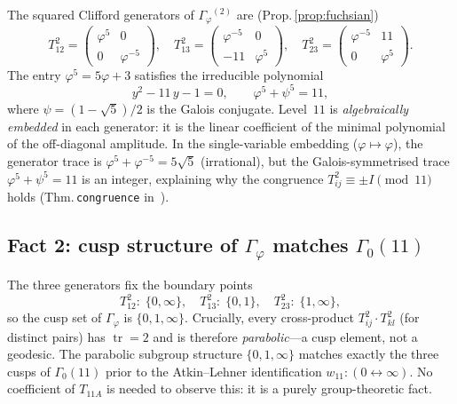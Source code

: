 \documentclass[11pt,a4paper]{article}
\theoremstyle{plain}
\theoremstyle{definition}
\theoremstyle{remark}
\numberwithin{equation}{section}
\providecommand{\Gphi}{\ensuremath{\Gamma_{\varphi}}}
\begin{document}
The squared Clifford generators of $\Gphi^{(2)}$ are (Prop.\,\ref{prop:fuchsian})
\begin{equation}
  T_{12}^{2}=\begin{pmatrix}\varphi^{5}&0\\0&\varphi^{-5}\end{pmatrix},\quad
  T_{13}^{2}=\begin{pmatrix}\varphi^{-5}&0\\-11&\varphi^{5}\end{pmatrix},\quad
  T_{23}^{2}=\begin{pmatrix}\varphi^{-5}&11\\0&\varphi^{5}\end{pmatrix}.
\end{equation}
The entry $\varphi^{5}=5\varphi+3$ satisfies the irreducible polynomial
\begin{equation}\label{eq:min-poly}
  y^{2} - 11\,y - 1 = 0,\qquad \varphi^{5}+\psi^{5}=11,
\end{equation}
where $\psi=(1-\sqrt{5})/2$ is the Galois conjugate.
Level~$11$ is \emph{algebraically embedded} in each generator: it is the linear
coefficient of the minimal polynomial of the off-diagonal amplitude.
In the single-variable embedding ($\varphi\mapsto\varphi$), the generator trace is
$\varphi^{5}+\varphi^{-5}=5\sqrt{5}$ (irrational), but the Galois-symmetrised trace
$\varphi^{5}+\psi^{5}=11$ is an integer, explaining why the congruence
$T_{ij}^{2}\equiv\pm I\pmod{11}$ holds (Thm.\,\texttt{congruence} in~\cite{golden-tetrad}).

\subsection*{Fact 2: cusp structure of $\Gphi$ matches $\Gamma_{0}(11)$}

The three generators fix the boundary points
\begin{equation}
  T_{12}^{2}:\;\{0,\infty\},\quad
  T_{13}^{2}:\;\{0,1\},\quad
  T_{23}^{2}:\;\{1,\infty\},
\end{equation}
so the cusp set of $\Gphi$ is $\{0,1,\infty\}$.
Crucially, every cross-product $T_{ij}^{2}\cdot T_{kl}^{2}$ (for distinct pairs) has
$\operatorname{tr}=2$ and is therefore \emph{parabolic}---a cusp element, not a geodesic.
The parabolic subgroup structure $\{0,1,\infty\}$ matches exactly the three cusps of
$\Gamma_{0}(11)$ prior to the Atkin--Lehner identification $w_{11}:(0\leftrightarrow\infty)$.
No coefficient of $T_{11A}$ is needed to observe this: it is a purely group-theoretic fact.
\end{document}
